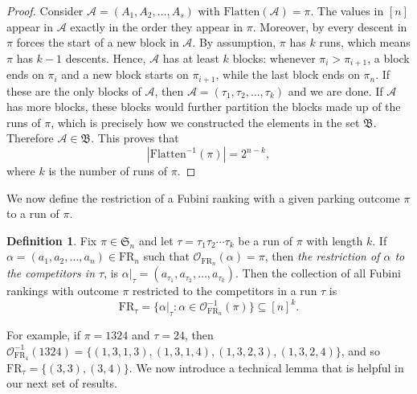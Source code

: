 \documentclass{amsart}
\newcommand{\Flatten}[0]{\mathrm{Flatten}}
\theoremstyle{definition}
\theoremstyle{definition}
\newtheorem{definition}{Definition}[section]
\theoremstyle{remark}
\newcommand{\FR}[1]{\mathrm{FR}_{#1}}
\newcommand{\out}{\mathcal{O}}
\newcommand{\Sym}{\mathfrak{S}}
\begin{document}
\begin{proof}
    Consider $\mathcal{A}=(A_1,A_2,\ldots,A_s)$ with  $\Flatten(\mathcal{A})=\pi$.
    The values in $[n]$ appear in 
    $\mathcal{A}$ exactly in the order they appear in $\pi$.
    Moreover, 
    by  every descent in $\pi$ forces the start of a new block in $\mathcal{A}$.
    By assumption,
    $\pi$ has $k$ runs, which means $\pi$ has $k-1$ descents.
    Hence, $\mathcal{A}$ has at least $k$ blocks: whenever $\pi_i>\pi_{i+1}$, a block ends on $\pi_i$ and a new block starts on $\pi_{i+1}$, while the last block ends on $\pi_n$.
    If these are the only blocks of $\mathcal{A}$, then $\mathcal{A}=(\tau_1,\tau_2,\ldots,\tau_k)$ and we are done.
    If $\mathcal{A}$ has more blocks, these blocks would further partition the blocks made up of the runs of $\pi$, which is precisely how we constructed the elements in the set $\mathfrak{B}$.
    Therefore $\mathcal{A}\in\mathfrak{B}$.
    This proves that 
    \[|\Flatten^{-1}(\pi)|=2^{n-k},\]
    where $k$ is the number of runs of $\pi$.
\end{proof}

We now define the restriction of a Fubini ranking with a given parking outcome $\pi$ to a run of $\pi$.
\begin{definition}\label{def:restrict alpha to a run}
    Fix $\pi\in\Sym_n$ and let $\tau=\tau_1\tau_2\cdots\tau_k$ be a run of $\pi$ with length $k$.
If $\alpha=(a_1,a_2,\ldots,a_n)\in\FR{n}$ such that $\out_{\FR{n}}(\alpha)=\pi$, then \textit{the restriction of $\alpha$ to the competitors in $\tau$}, is $\alpha|_{\tau}=(a_{\tau_1},a_{\tau_2},\ldots,a_{\tau_{k}})$.
Then the collection of all Fubini rankings with outcome $\pi$ restricted to the competitors in a run $\tau$ is 
\[\FR{\tau}=\{\alpha|_{\tau}:\alpha\in\out_{\FR{n}}^{-1}
(\pi)\}\subseteq[n]^k.\]
\end{definition}
For example, 
if $\pi=1324$ and $\tau=24$, then 
$\out_{\FR{4}}^{-1}(1324)=\{(1,3,1,3),(1,3,1,4),(1,3,2,3),(1,3,2,4)\}$,
and so $\FR{\tau}=\{(3,3),(3,4)\}$.
We now introduce a technical lemma that is  helpful in our next set of results.
\end{document}
